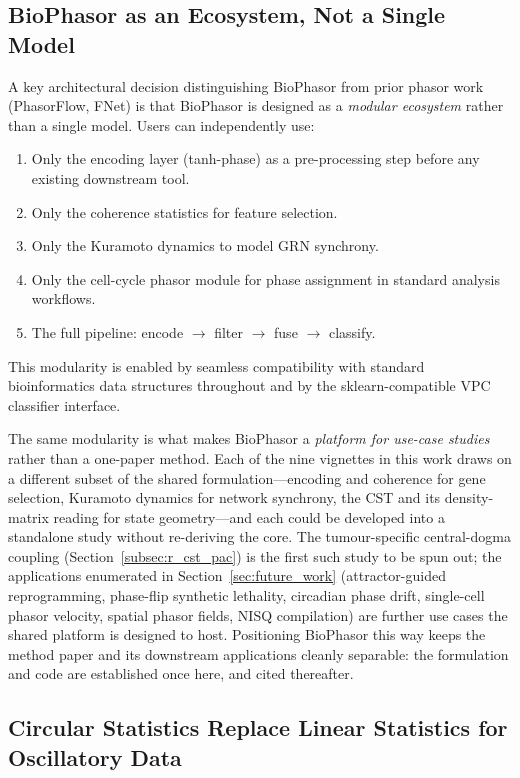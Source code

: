 \documentclass[preprint,12pt,amsmath,amssymb,superscriptaddress,floatfix]{revtex4-2}
\begin{document}
\subsection{BioPhasor as an Ecosystem, Not a Single Model}

A key architectural decision distinguishing BioPhasor from prior phasor
work (PhasorFlow, FNet) is that BioPhasor is designed as a
\emph{modular ecosystem} rather than a single model.
Users can independently use:

\begin{enumerate}
    \item Only the encoding layer (tanh-phase) as a pre-processing step
    before any existing downstream tool.
    \item Only the coherence statistics for feature selection.
    \item Only the Kuramoto dynamics to model GRN synchrony.
    \item Only the cell-cycle phasor module for phase assignment in standard
    analysis workflows.
    \item The full pipeline: encode $\to$ filter $\to$ fuse $\to$ classify.
\end{enumerate}

This modularity is enabled by seamless compatibility with standard
bioinformatics data structures throughout
and by the sklearn-compatible VPC classifier interface.

The same modularity is what makes BioPhasor a \emph{platform for use-case
studies} rather than a one-paper method. Each of the nine vignettes in this work
draws on a different subset of the shared formulation---encoding and coherence
for gene selection, Kuramoto dynamics for network synchrony, the CST and its
density-matrix reading for state geometry---and each could be developed into a
standalone study without re-deriving the core. The tumour-specific central-dogma
coupling (Section~\ref{subsec:r_cst_pac}) is the first such study to be spun out;
the applications enumerated in Section~\ref{sec:future_work} (attractor-guided
reprogramming, phase-flip synthetic lethality, circadian phase drift,
single-cell phasor velocity, spatial phasor fields, NISQ compilation) are further
use cases the shared platform is designed to host. Positioning BioPhasor this way
keeps the method paper and its downstream applications cleanly separable: the
formulation and code are established once here, and cited thereafter.

\subsection{Circular Statistics Replace Linear Statistics for Oscillatory Data}
\end{document}
